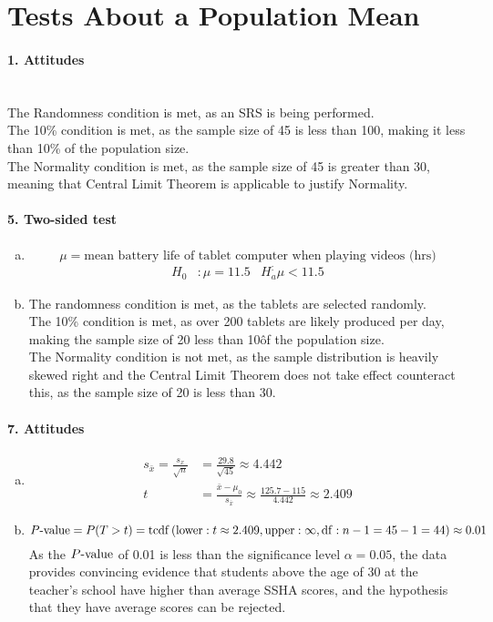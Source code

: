 \documentclass[../Homework]{subfiles}
\begin{document}
	\section{Tests About a Population Mean}
		\paragraph{1. Attitudes}\ \\
			The Randomness condition is met, as an SRS is being performed. \\
			The 10\% condition is met, as the sample size of 45 is less than 100, making it less than 10\% of the population size. \\
			The Normality condition is met, as the sample size of 45 is greater than 30, meaning that Central Limit Theorem is applicable to justify Normality.
		\paragraph{5. Two-sided test}
			\begin{enumerate}[a.]
			\item
				\[\mu = \text{mean battery life of tablet computer when playing videos (hrs)}\]
					\begin{align*}
						H_0&: \mu = 11.5 & H_a^: \mu < 11.5
					\end{align*}
			\item
				The randomness condition is met, as the tablets are selected randomly. \\
				The 10\% condition is met, as over 200 tablets are likely produced per day, making the sample size of 20 less than 10\^ of the population size. \\
				The Normality condition is not met, as the sample distribution is heavily skewed right and the Central Limit Theorem does not take effect counteract this, as the sample size of 20 is less than 30.
			\end{enumerate}
		\paragraph{7. Attitudes}
			\begin{enumerate}[a.]
				\item
					\begin{align*}
						s_{\bar{x}} = \frac{s_x}{\sqrt{n}} &= \frac{29.8}{\sqrt{45}} \approx 4.442 \\
						t &= \frac{\bar{x} - \mu_0}{s_{\bar{x}}} \approx \frac{125.7 - 115}{4.442} \approx 2.409
					\end{align*}
				\item
					\[P\text{-value} = P(T > t) = \operatorname{tcdf}\left(\operatorname{lower}: t \approx 2.409, \operatorname{upper}: \infty, \operatorname{df}: n - 1 = 45 - 1 = 44\right) \approx 0.01\]
					As the $P\text{-value}$ of 0.01 is less than the significance level $\alpha = 0.05$, the data provides convincing evidence that students above the age of 30 at the teacher's school have higher than average SSHA scores, and the hypothesis that they have average scores can be rejected.
			\end{enumerate}
\end{document}
